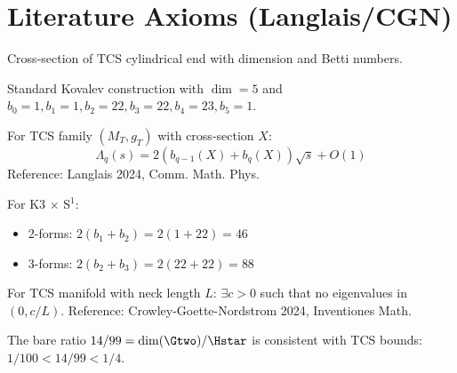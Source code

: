 \section{Literature Axioms (Langlais/CGN)}

\begin{definition}\label{def:CrossSection}
    \leanok
    Cross-section of TCS cylindrical end with dimension and Betti numbers.
\end{definition}

\begin{definition}\label{def:K3_S1}
    \leanok
    Standard Kovalev construction with $\dim = 5$ and
    $b_0 = 1, b_1 = 1, b_2 = 22, b_3 = 22, b_4 = 23, b_5 = 1$.
\end{definition}

\begin{theorem}\label{thm:langlais}
    For TCS family $(M_T, g_T)$ with cross-section $X$:
    \[
        \Lambda_q(s) = 2(b_{q-1}(X) + b_q(X))\sqrt{s} + O(1)
    \]
    Reference: Langlais 2024, Comm. Math. Phys.
\end{theorem}

\begin{theorem}\label{thm:K3_S1_density}
    \leanok
    For K3 $\times$ S$^1$:
    \begin{itemize}
        \item 2-forms: $2(b_1 + b_2) = 2(1 + 22) = 46$
        \item 3-forms: $2(b_2 + b_3) = 2(22 + 22) = 88$
    \end{itemize}
\end{theorem}

\begin{theorem}\label{thm:cgn_no_small}
    For TCS manifold with neck length $L$:
    $\exists c > 0$ such that no eigenvalues in $(0, c/L)$.
    Reference: Crowley-Goette-Nordstrom 2024, Inventiones Math.
\end{theorem}

\begin{theorem}\label{thm:gift_prediction}
    \leanok
    The bare ratio $14/99 = \dim(\Gtwo)/\Hstar$ is consistent
    with TCS bounds: $1/100 < 14/99 < 1/4$.
\end{theorem}

